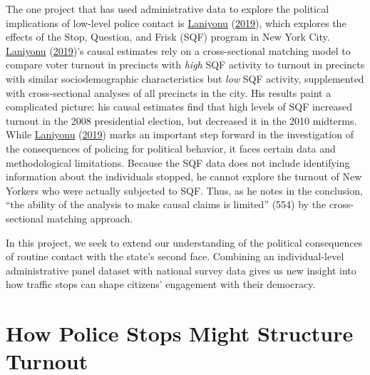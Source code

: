 \documentclass[
  12pt,
]{article}
\begin{document}
The one project that has used administrative data to explore the political implications of low-level police contact is \protect\hyperlink{ref-Laniyonu2019}{Laniyonu} (\protect\hyperlink{ref-Laniyonu2019}{2019}), which explores the effects of the Stop, Question, and Frisk (SQF) program in New York City. \protect\hyperlink{ref-Laniyonu2019}{Laniyonu} (\protect\hyperlink{ref-Laniyonu2019}{2019})'s causal estimates rely on a cross-sectional matching model to compare voter turnout in precincts with \emph{high} SQF activity to turnout in precincts with similar sociodemographic characteristics but \emph{low} SQF activity, supplemented with cross-sectional analyses of all precincts in the city. His results paint a complicated picture: his causal estimates find that high levels of SQF increased turnout in the 2008 presidential election, but decreased it in the 2010 midterms. While \protect\hyperlink{ref-Laniyonu2019}{Laniyonu} (\protect\hyperlink{ref-Laniyonu2019}{2019}) marks an important step forward in the investigation of the consequences of policing for political behavior, it faces certain data and methodological limitations. Because the SQF data does not include identifying information about the individuals stopped, he cannot explore the turnout of New Yorkers who were actually subjected to SQF. Thus, as he notes in the conclusion, ``the ability of the analysis to make causal claims is limited'' (554) by the cross-sectional matching approach.

In this project, we seek to extend our understanding of the political consequences of routine contact with the state's second face. Combining an individual-level administrative panel dataset with national survey data gives us new insight into how traffic stops can shape citizens' engagement with their democracy.

\hypertarget{how-police-stops-might-structure-turnout}{%
\section*{How Police Stops Might Structure Turnout}\label{how-police-stops-might-structure-turnout}}
\end{document}
